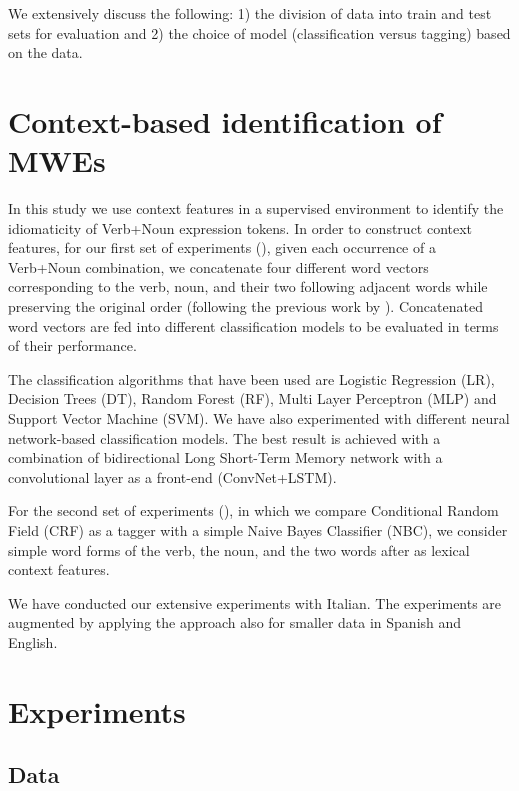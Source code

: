 \documentclass[output=paper
,modfonts
,nonflat]{langsci/langscibook}
\begin{document}
We extensively discuss the following: 1) the division of data into train and test sets for evaluation and 2) the choice of model (classification versus tagging) based on the data.

\section{Context-based identification of MWEs}

In this study we use context features in a supervised environment to identify the idiomaticity of Verb+Noun expression tokens. %
In order to construct context features, for our first set of experiments (), given each occurrence of a Verb+Noun combination, we concatenate four different word vectors corresponding to the verb, noun, and their two following adjacent words while preserving the original order (following the previous work by \citealt{taslimipoor2017}). Concatenated word vectors are fed into different classification models to be evaluated in terms of their performance.

The classification algorithms that have been used are Logistic Regression (LR), Decision Trees (DT), Random Forest (RF), Multi Layer Perceptron (MLP) and Support Vector Machine (SVM). 
We have also experimented with different neural network-based classification models. The best result is achieved with a combination of bidirectional Long Short-Term Memory network with a convolutional layer as a front-end (ConvNet+LSTM).  

For the second set of experiments (), in which we compare Conditional Random Field (CRF) as a tagger with a simple Naive Bayes Classifier (NBC), we consider simple word forms of the verb, the noun, and the two words after as lexical context features.

We have conducted our extensive experiments with Italian. The experiments are augmented by applying the approach also for smaller data in Spanish and English.

\section{Experiments}

\subsection{Data}
\end{document}

